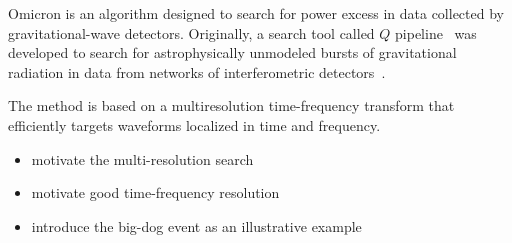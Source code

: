 Omicron is an algorithm designed to search for power excess in data collected by gravitational-wave detectors. Originally, a search tool called $Q$ pipeline~\cite{Chatterji:2004} was developed to search for astrophysically unmodeled bursts of gravitational radiation in data from networks of interferometric detectors~\cite{Abbott:2009zi,Abbott:2009up,Abadie:2010mt}.

The method is based on a multiresolution time-frequency transform that efficiently targets waveforms localized in time and frequency. 

\begin{itemize}
\item motivate the multi-resolution search
\item motivate good time-frequency resolution
\item introduce the big-dog event as an illustrative example
\end{itemize}

